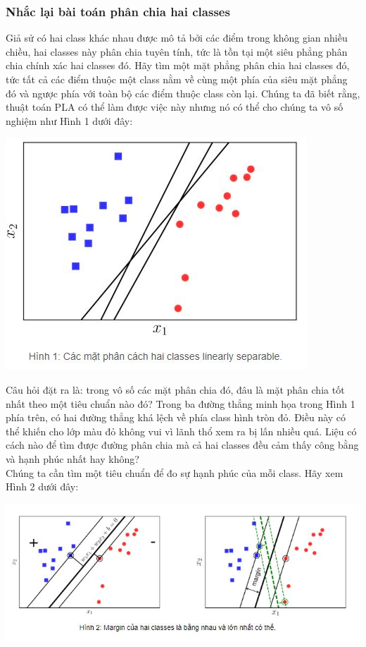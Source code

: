 \documentclass[12pt,a4paper]{article}
\begin{document}
 \subsubsection{Nhắc lại bài toán phân chia hai classes}
 Giả sử có hai class khác nhau được mô tả bởi các điểm trong không gian nhiều chiều, hai classes này phân chia tuyên tính, tức là tồn tại một siêu phẳng phân chia chính xác hai classes đó. Hãy tìm một mặt phẳng phân chia hai classes đó, tức tất cả các điểm thuộc một class nằm về cùng một phía của siêu mặt phẳng đó và ngược phía với toàn bộ các điểm thuộc class còn lại. Chúng ta đã biết rằng, thuật toán PLA có thể làm được việc này nhưng nó có thể cho chúng ta vô số nghiệm như Hình 1 dưới đây:
 \begin{center}
 \includegraphics[scale=1]{img/img1}
 \end{center}
 Câu hỏi đặt ra là: trong vô số các mặt phân chia đó, đâu là mặt phân chia tốt nhất theo một tiêu chuẩn nào đó? Trong ba đường thẳng minh họa trong Hình 1 phía trên, có hai đường thẳng khá lệch về phía class hình tròn đỏ. Điều này có thể khiến cho lớp màu đỏ không vui vì lãnh thổ xem ra bị lấn nhiều quá. Liệu có cách nào để tìm được đường phân chia mà cả hai classes đều cảm thấy công bằng và hạnh phúc nhất hay không?\\Chúng ta cần tìm một tiêu chuẩn để đo sự hạnh phúc của mỗi class. Hãy xem Hình 2 dưới đây:
 \begin{center}
 \includegraphics[scale=1]{img/img2}
 \end{center}
\end{document}
